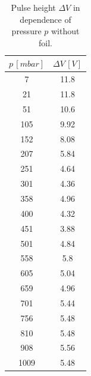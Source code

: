 \begin{table}[H]
	\centering
	\caption{Pulse height $\Delta V$ in dependence of pressure $p$ without foil.}
	\label{tab:stopping_wof}
	\begin{tabular}{c | c}
		\toprule
		$p \, [mbar]$ & $\Delta V \, [V]$\\
		\midrule
		7 & 11.8 \\
		 21 & 11.8 \\
		 51 & 10.6 \\
		 105 & 9.92 \\
		 152 & 8.08 \\
		 207 & 5.84 \\
		 251 & 4.64 \\
		 301 & 4.36 \\
		 358 & 4.96 \\
		 400 & 4.32 \\
		 451 & 3.88 \\
		 501 & 4.84 \\
		 558 & 5.8 \\
		 605 & 5.04 \\
		 659 & 4.96 \\
		 701 & 5.44 \\
		 756 & 5.48 \\
		 810 & 5.48 \\
		 908 & 5.56 \\
		 1009 & 5.48 \\
		 \bottomrule
	\end{tabular}
\end{table}
